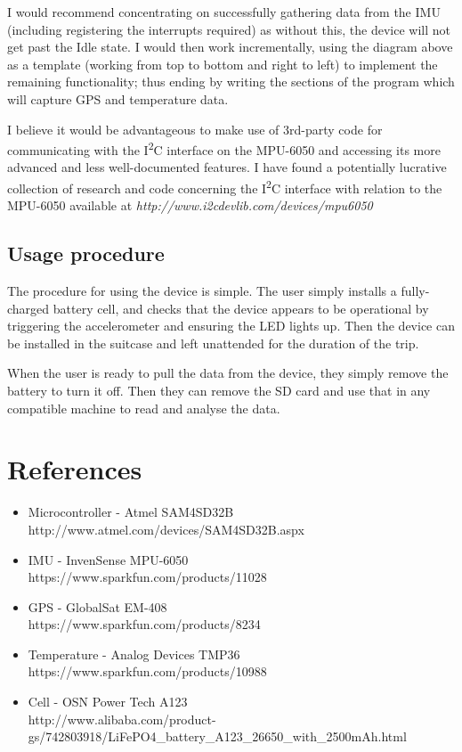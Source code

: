 \documentclass[a4paper, twoside]{article}
\begin{document}
I would recommend concentrating on successfully gathering data from the IMU
(including registering the interrupts required) as without this, the device will
not get past the Idle state. I would then work incrementally, using the diagram
above as a template (working from top to bottom and right to left) to implement
the remaining functionality; thus ending by writing the sections of the program
which will capture GPS and temperature data.

I believe it would be advantageous to make use of 3rd-party code for
communicating with the I\textsuperscript{2}C interface on the MPU-6050 and
accessing its more advanced and less well-documented features. I have found a
potentially lucrative collection of research and code concerning the
I\textsuperscript{2}C interface with relation to the MPU-6050 available at
\emph{http://www.i2cdevlib.com/devices/mpu6050}

\clearpage
\subsection{Usage procedure}
The procedure for using the device is simple. The user simply installs a
fully-charged battery cell, and checks that the device appears to be operational
by triggering the accelerometer and ensuring the LED lights up. Then the device
can be installed in the suitcase and left unattended for the duration of the
trip.

When the user is ready to pull the data from the device, they simply remove the
battery to turn it off. Then they can remove the SD card and use that in any
compatible machine to read and analyse the data.

\section{References}
\begin{itemize}
	\item{Microcontroller - Atmel SAM4SD32B\\http://www.atmel.com/devices/SAM4SD32B.aspx}
	\item{IMU - InvenSense MPU-6050\\https://www.sparkfun.com/products/11028}
	\item{GPS - GlobalSat EM-408\\https://www.sparkfun.com/products/8234}
	\item{Temperature - Analog Devices TMP36\\https://www.sparkfun.com/products/10988}
	\item{Cell - OSN Power Tech A123\\
		http://www.alibaba.com/product-gs/742803918/LiFePO4\_battery\_A123\_26650\_with\_2500mAh.html}
\end{itemize}
\end{document}
